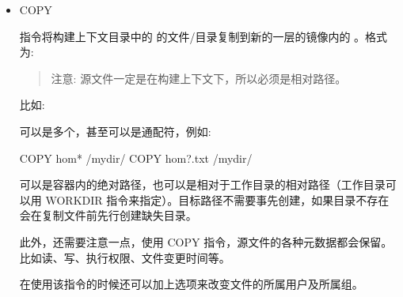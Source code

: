 \documentclass[letterpaper,10pt,english]{sphinxmanual}
\begin{document}
\begin{itemize}
\item {} 
COPY

指令将构建上下文目录中的 的文件/目录复制到新的一层的镜像内的 。格式为:

\begin{sphinxVerbatim}[commandchars=\\\{\}]
 \PYG{p}{[}\PYG{p}{]}  
\end{sphinxVerbatim}
\begin{quote}

注意: 源文件一定是在构建上下文下，所以必须是相对路径。
\end{quote}

比如:

\begin{sphinxVerbatim}[commandchars=\\\{\}]
  
\end{sphinxVerbatim}

可以是多个，甚至可以是通配符，例如:

\begin{sphinxVerbatim}[commandchars=\\\{\}]
COPY hom* /mydir/
COPY hom?.txt /mydir/
\end{sphinxVerbatim}

 可以是容器内的绝对路径，也可以是相对于工作目录的相对路径（工作目录可以用 WORKDIR 指令来指定）。目标路径不需要事先创建，如果目录不存在会在复制文件前先行创建缺失目录。

此外，还需要注意一点，使用 COPY 指令，源文件的各种元数据都会保留。比如读、写、执行权限、文件变更时间等。

在使用该指令的时候还可以加上选项来改变文件的所属用户及所属组。


\end{itemize}
\end{document}
